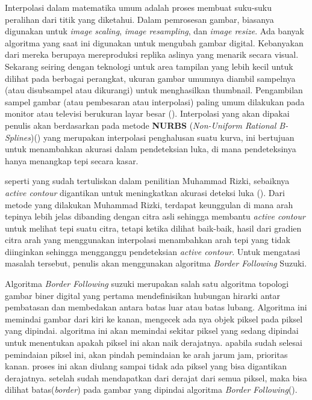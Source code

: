 Interpolasi dalam matematika umum adalah proses membuat 
suku-suku peralihan dari titik yang diketahui. Dalam 
pemrosesan gambar, biasanya digunakan untuk \textit{image scaling}, 
\textit{image resampling}, dan \textit{image resize}. Ada banyak algoritma 
yang saat ini digunakan untuk mengubah gambar digital. 
Kebanyakan dari mereka berupaya mereproduksi replika aslinya 
yang menarik secara visual. Sekarang seiring dengan 
teknologi untuk area tampilan yang lebih kecil untuk dilihat 
pada berbagai perangkat, ukuran gambar umumnya diambil 
sampelnya (atau disubsampel atau dikurangi) untuk 
menghasilkan thumbnail. Pengambilan sampel gambar 
(atau pembesaran atau interpolasi) paling umum dilakukan 
pada monitor atau televisi berukuran layar besar 
(\cite{Parsania}). Interpolasi yang akan dipakai penulis 
akan berdasarkan pada metode \textbf{NURBS} 
(\textit{Non-Uniform Rational B-Splines})(\cite{PiegTill96}) 
yang merupakan interpolasi penghalusan suatu kurva, ini 
bertujuan untuk menambahkan akurasi dalam pendeteksian luka, 
di mana pendeteksinya hanya menangkap tepi secara kasar.

seperti yang sudah tertuliskan dalam penilitian Muhammad 
Rizki, sebaiknya \textit{active contour} digantikan untuk 
meningkatkan akurasi deteksi luka (\cite{MRizki}). Dari metode 
yang dilakukan Muhammad Rizki, terdapat 
keunggulan di mana arah tepinya lebih jelas dibanding dengan 
citra asli sehingga membantu \textit{active contour} untuk 
melihat tepi suatu citra, tetapi ketika dilihat baik-baik, 
hasil dari gradien citra arah yang menggunakan interpolasi 
menambahkan arah tepi yang tidak diinginkan sehingga 
mengganggu pendeteksian \textit{active contour}. Untuk 
mengatasi masalah tersebut, penulis akan menggunakan 
algoritma \textit{Border Following} Suzuki.

Algoritma \textit{Border Following} 
suzuki merupakan salah satu algoritma topologi 
gambar biner digital yang pertama mendefinisikan hubungan 
hirarki antar pembatasan dan membedakan antara batas luar 
atau batas lubang.
Algoritma ini memindai gambar dari kiri ke kanan, mengecek 
ada nya objek piksel pada piksel yang dipindai. algoritma ini 
akan memindai sekitar piksel yang sedang dipindai untuk 
menentukan apakah piksel ini akan naik derajatnya. 
apabila sudah selesai pemindaian piksel ini, akan pindah 
pemindaian ke arah jarum jam, prioritas kanan. proses 
ini akan diulang sampai tidak ada piksel yang bisa digantikan
derajatnya. setelah sudah mendapatkan dari derajat dari 
semua piksel, maka bisa dilihat batas(\textit{border}) pada
gambar yang dipindai algoritma \textit{Border Following}(\cite{Suzuki}).

